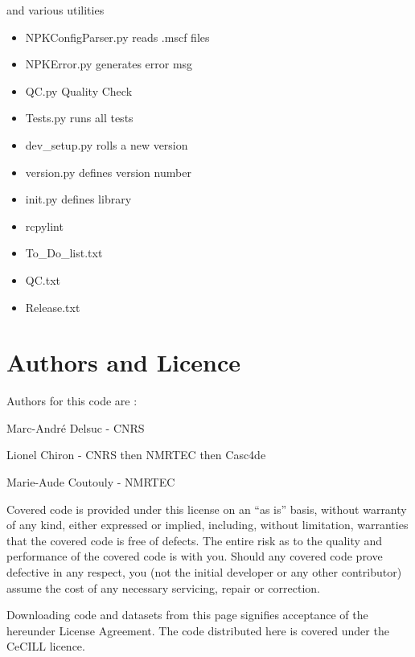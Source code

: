 \documentclass[letterpaper,10pt,openany,oneside]{sphinxmanual}
\begin{document}
and various utilities
\begin{itemize}
\item {} 
NPKConfigParser.py reads .mscf files

\item {} 
NPKError.py generates error msg

\item {} 
QC.py Quality Check

\item {} 
Tests.py runs all tests

\item {} 
dev\_setup.py rolls a new version

\item {} 
version.py defines version number

\item {} 
init.py defines library

\item {} 
rcpylint

\item {} 
To\_Do\_list.txt

\item {} 
QC.txt

\item {} 
Release.txt

\end{itemize}


\section{Authors and Licence}
\label{rst/introduction:authors-and-licence}
Authors for this code are :

Marc-André Delsuc - CNRS

Lionel Chiron - CNRS then NMRTEC then Casc4de

Marie-Aude Coutouly - NMRTEC

Covered code is provided under this license on an ``as is'' basis, without warranty of any kind, either expressed or implied, including, without limitation, warranties that the covered code is free of defects. The entire risk as to the quality and performance of the covered code is with you. Should any covered code prove defective in any respect, you (not the initial developer or any other contributor) assume the cost of any necessary servicing, repair or correction.

Downloading code and datasets from this page signifies acceptance of the hereunder License Agreement. The code distributed here is covered under the CeCILL licence.
\end{document}

